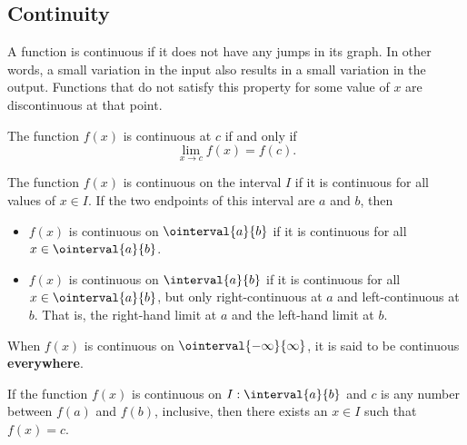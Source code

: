 \documentclass{article}
\begin{document}
\subsection{Continuity}
A function is continuous if it does not have any jumps in its graph. In
other words, a small variation in the input also results in a small
variation in the output. Functions that do not satisfy this property
for some value of \(x\) are discontinuous at that point.
\begin{theorem}
    The function \(f\left( x \right)\) is continuous at \(c\) if and
    only if
    \begin{equation*}
        \lim_{x\to c} f\left( x \right) = f\left( c \right).
    \end{equation*}
\end{theorem}
\begin{theorem}
    The function \(f\left( x \right)\) is continuous on the interval
    \(I\) if it is continuous for all values of \(x \in I\). If the two
    endpoints of this interval are \(a\) and \(b\), then
    \begin{itemize}
        \item \(f\left( x \right)\) is continuous on \(\ointerval{a}{b}\)
              if it is continuous for all \(x\in \ointerval{a}{b}\).
        \item \(f\left( x \right)\) is continuous on \(\interval{a}{b}\)
              if it is continuous for all \(x\in \ointerval{a}{b}\), but
              only right-continuous at \(a\) and left-continuous at \(b\).
              That is, the right-hand limit at \(a\) and the left-hand
              limit at \(b\).
    \end{itemize}
    When \(f\left( x \right)\) is continuous on \(\ointerval{-\infty}{\infty}\),
    it is said to be continuous \textbf{everywhere}.
\end{theorem}
\begin{theorem}
    If the function \(f\left( x \right)\) is continuous on
    \(I:\interval{a}{b}\) and \(c\) is any number between
    \(f\left( a \right)\) and \(f\left( b \right)\), inclusive, then
    there exists an \(x\in I\) such that \(f\left( x \right)=c\).
\end{theorem}
\end{document}
